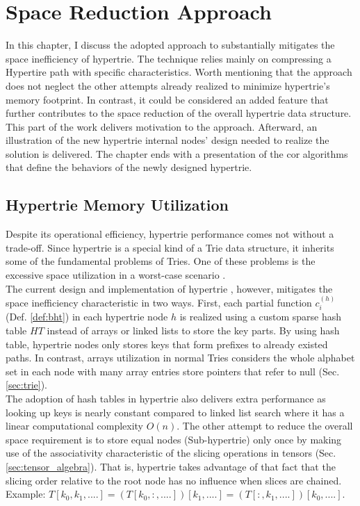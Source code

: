 \chapter{Space Reduction Approach}
\label{ch:approach}

In this chapter, I discuss the adopted approach to substantially mitigates the space inefficiency of hypertrie.  
The technique relies mainly on compressing a Hypertire path with specific characteristics. 
Worth mentioning that the approach does not neglect the other attempts already realized to minimize hypertrie's memory footprint. 
In contrast, it could be considered an added feature that further contributes to the space reduction of the overall hypertrie data structure. \\

This part of the work delivers motivation to the approach. Afterward, an illustration of the new hypertrie internal nodes' design needed to realize the solution is delivered. The chapter ends with a presentation of the cor algorithms that define the behaviors of the newly designed hypertrie. 


\section{Hypertrie Memory Utilization}
\label{sec:hypertrie_memory_utilization}
Despite its operational efficiency, hypertrie performance comes not without a trade-off. 
Since hypertrie is a special kind of a Trie data structure, it inherits some of the fundamental problems of  Tries. 
One of these problems is the excessive space utilization in a worst-case scenario \cite{Brass:2008:ADS:1434862}.  \\

The current design and implementation of hypertrie \cite{tentris2020}, however, mitigates the space inefficiency characteristic in two ways. 
First, each partial function $c^{(h)}_i$ (Def. \ref{def:bht}) in each hypertrie node $h$ is realized using a custom sparse hash table $HT$ instead of arrays or linked lists to store the key parts. 
By using hash table, hypertrie nodes only stores keys that form prefixes to already existed paths. 
In contrast, arrays utilization in normal Tries considers the whole alphabet set in each node with many array entries store pointers that refer to null (Sec. \ref{sec:trie}).  \\

The adoption of hash tables in hypertrie also delivers extra performance as looking up keys is nearly constant compared to linked list search where it has a linear computational complexity $O(n)$. 
The other attempt to reduce the overall space requirement is to store equal nodes (Sub-hypertrie) only once by making use of the associativity characteristic of the slicing operations in tensors (Sec. \ref{sec:tensor_algebra}). That is, hypertrie takes advantage of that fact that the slicing order relative to the root node has no influence when slices are chained. Example: $T[k_0, k_1, ....] = (T[k_0, :, ....])[k_1, ....] = (T[:, k_1, ....])[k_0, ....].$ \\

